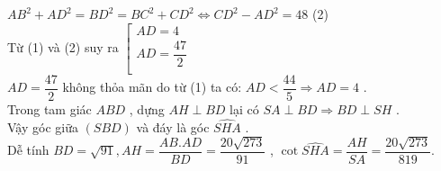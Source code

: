 \begin{ex}
{$A{B^2}+A{D^2}=B{D^2}=B{C^2}+C{D^2}\Leftrightarrow C{D^2}-A{D^2}=48$ (2)\\
Từ (1) và (2) suy ra $\left[\begin{matrix}
AD=4\\
AD=\dfrac{47}{2}\\
\end{matrix}\right.$\\
$AD=\dfrac{47}{2}$ không thỏa mãn do từ (1) ta có: $AD<\dfrac{44}{5}\Rightarrow AD=4$ .\\
Trong tam giác $ABD$ , dựng $AH\perp BD$ lại có $SA\perp BD\Rightarrow BD\perp SH$ .\\
Vậy góc giữa $\left(SBD\right)$ và đáy là góc $\widehat{SHA}$ .\\
Dễ tính $BD=\sqrt{91},AH=\dfrac{AB.AD}{BD}=\dfrac{20\sqrt{273}}{91}$ , $\cot\widehat{SHA}=\dfrac{AH}{SA}=\dfrac{20\sqrt{273}}{819}$.}
\end{ex}

